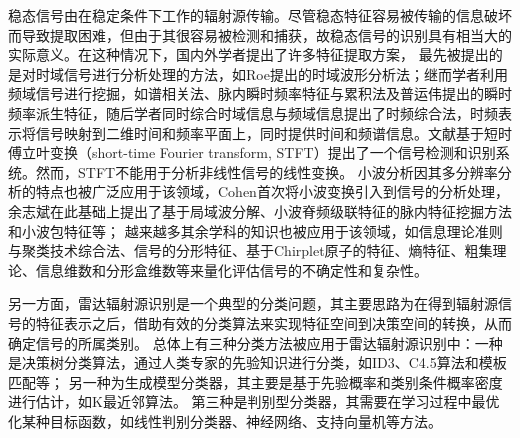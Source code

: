 稳态信号由在稳定条件下工作的辐射源传输。尽管稳态特征容易被传输的信息破坏而导致提取困难，但由于其很容易被检测和捕获，故稳态信号的识别具有相当大的实际意义。在这种情况下，国内外学者提出了许多特征提取方案，
最先被提出的是对时域信号进行分析处理的方法，如Roe提出的时域波形分析法；继而学者利用频域信号进行挖掘，如谱相关法、脉内瞬时频率特征与累积法及普运伟提出的瞬时频率派生特征，随后学者同时综合时域信息与频域信息提出了时频综合法，时频表示将信号映射到二维时间和频率平面上，同时提供时间和频谱信息。文献\cite{lopez2005digital}基于短时傅立叶变换（short-time Fourier transform, STFT）提出了一个信号检测和识别系统。然而，STFT不能用于分析非线性信号的线性变换。
小波分析因其多分辨率分析的特点也被广泛应用于该领域，Cohen首次将小波变换引入到信号的分析处理，余志斌在此基础上提出了基于局域波分解、小波脊频级联特征的脉内特征挖掘方法和小波包特征等；
越来越多其余学科的知识也被应用于该领域，如信息理论准则与聚类技术综合法、信号的分形特征、基于Chirplet原子的特征、熵特征、粗集理论、信息维数和分形盒维数等来量化评估信号的不确定性和复杂性。

另一方面，雷达辐射源识别是一个典型的分类问题，其主要思路为在得到辐射源信号的特征表示之后，借助有效的分类算法来实现特征空间到决策空间的转换，从而确定信号的所属类别。
总体上有三种分类方法被应用于雷达辐射源识别中：一种是决策树分类算法，通过人类专家的先验知识进行分类，如ID3、C4.5算法和模板匹配等；
另一种为生成模型分类器，其主要是基于先验概率和类别条件概率密度进行估计，如K最近邻算法。
第三种是判别型分类器，其需要在学习过程中最优化某种目标函数，如线性判别分类器、神经网络、支持向量机等方法。

